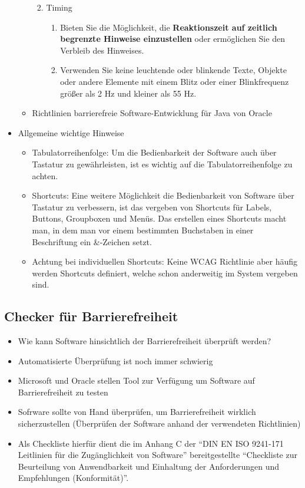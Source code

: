 \documentclass[paper=a4, fontsize=11pt]{scrartcl} %
\numberwithin{equation}{section} %
\numberwithin{figure}{section} %
\numberwithin{table}{section} %
\begin{document}
\begin{itemize}
\begin{itemize}
\begin{enumerate}[label*=\arabic*.]
\begin{enumerate}[label*=\arabic*.]
\end{enumerate}
\item Timing
\begin{enumerate}[label*=\arabic*.]
\item Bieten Sie die Möglichkeit, die \textbf{Reaktionszeit auf zeitlich begrenzte Hinweise einzustellen} oder ermöglichen Sie den Verbleib des Hinweises.
\item Verwenden Sie keine leuchtende oder blinkende Texte, Objekte oder andere Elemente mit einem Blitz oder einer Blinkfrequenz größer als 2 Hz und kleiner als 55 Hz.
\end{enumerate}
\end{enumerate}
\item Richtlinien barrierefreie Software-Entwicklung für Java von Oracle
\end{itemize}
\item Allgemeine wichtige Hinweise
\begin{itemize}
\item Tabulatorreihenfolge: Um die Bedienbarkeit der Software auch über Tastatur zu gewährleisten, ist es wichtig auf die Tabulatorreihenfolge zu achten.
\item Shortcuts: Eine weitere Möglichkeit die Bedienbarkeit von Software über Tastatur zu verbessern, ist das vergeben von Shortcuts für Labels, Buttons, Groupboxen und Menüs. Das erstellen eines Shortcuts macht man, in dem man vor einem bestimmten Buchstaben in einer Beschriftung ein \&-Zeichen setzt.
\item Achtung bei individuellen Shortcuts: Keine WCAG Richtlinie aber häufig werden Shortcuts definiert, welche schon anderweitig im System vergeben sind.
\end{itemize}
\end{itemize}

\subsection{Checker für Barrierefreiheit}

\begin{itemize}
\item Wie kann Software hinsichtlich der Barrierefreiheit überprüft werden?
\item Automatisierte Überprüfung ist noch immer schwierig
\item Microsoft und Oracle stellen Tool zur Verfügung um Software auf Barrierefreiheit zu testen
\item Sofrware sollte von Hand überprüfen, um Barrierefreiheit wirklich sicherzustellen (Überprüfen der Software anhand der verwendeten Richtlinien)
\item Als Checkliste hierfür dient die im Anhang C der ``DIN EN ISO 9241-171 Leitlinien für die Zugänglichkeit von Software'' bereitgestellte ``Checkliste zur Beurteilung von Anwendbarkeit und Einhaltung der Anforderungen und Empfehlungen (Konformität)''.
\end{itemize}
\end{document}
